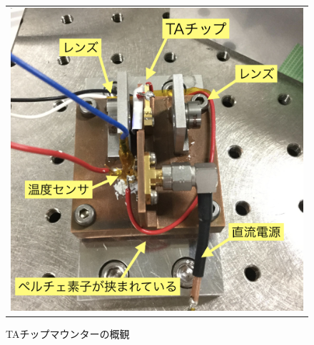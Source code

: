 \documentclass[uplatex, dvipdfmx, a4paper, report, papersize, 11pt]{jsbook}
\begin{document}
\begin{figure}[htpb]
  \centering
    \begin{tabular}{c}


      \begin{minipage}{0.50\hsize}
        \centering
          \includegraphics[keepaspectratio,  scale=0.30,  angle=0]
                          {figures/chapter4/TA_mounter_photo_comments.png}
                          \caption{TAチップマウンターの概観}
                          \label{TA_mounter_photo_comments}
      \end{minipage}



\end{tabular}
\end{figure}
\end{document}
